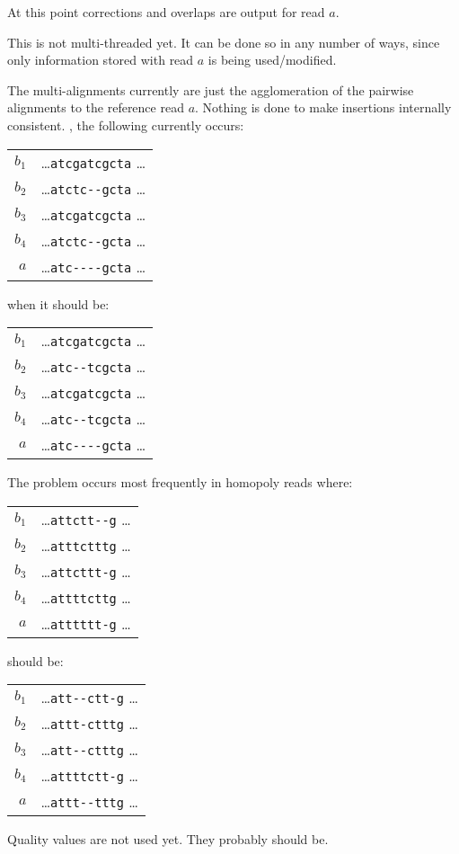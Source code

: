 \documentclass[letterpaper,11pt]{article}
\newenvironment{technotes}{\bq\small\bf\bi\exdent{Technical Notes:}}{\ei\eq}
\def\btn{\begin{technotes}}
\def\etn{\end{technotes}}
\begin{document}
  At this point corrections and overlaps are output for read $a$.
  \btn
  \item
    This is not multi-threaded yet.  It can be done so in any number of ways,
    since only information stored with read $a$ is being used/modified.
  \item
    The multi-alignments currently are just the agglomeration of the
    pairwise alignments to the reference read $a$.  Nothing is done to
    make insertions internally consistent.  \Eg, the following currently
    occurs:
    \bq
      \begin{tabular}{rl}
        $b_1$ & \ldots \verb`atcgatcgcta` \ldots \\
        $b_2$ & \ldots \verb`atctc--gcta` \ldots \\
        $b_3$ & \ldots \verb`atcgatcgcta` \ldots \\
        $b_4$ & \ldots \verb`atctc--gcta` \ldots \\
          $a$ & \ldots \verb`atc----gcta` \ldots
      \end{tabular}
    \eq
    when it should be:
    \bq
      \begin{tabular}{rl}
        $b_1$ & \ldots \verb`atcgatcgcta` \ldots \\
        $b_2$ & \ldots \verb`atc--tcgcta` \ldots \\
        $b_3$ & \ldots \verb`atcgatcgcta` \ldots \\
        $b_4$ & \ldots \verb`atc--tcgcta` \ldots \\
          $a$ & \ldots \verb`atc----gcta` \ldots
      \end{tabular}
    \eq
    The problem occurs most frequently in homopoly reads where:
    \bq
      \begin{tabular}{rl}
        $b_1$ & \ldots \verb`attctt--g` \ldots \\
        $b_2$ & \ldots \verb`atttctttg` \ldots \\
        $b_3$ & \ldots \verb`attcttt-g` \ldots \\
        $b_4$ & \ldots \verb`attttcttg` \ldots \\
          $a$ & \ldots \verb`atttttt-g` \ldots
      \end{tabular}
    \eq
    should be:
    \bq
      \begin{tabular}{rl}
        $b_1$ & \ldots \verb`att--ctt-g` \ldots \\
        $b_2$ & \ldots \verb`attt-ctttg` \ldots \\
        $b_3$ & \ldots \verb`att--ctttg` \ldots \\
        $b_4$ & \ldots \verb`attttctt-g` \ldots \\
          $a$ & \ldots \verb`attt--tttg` \ldots
      \end{tabular}
    \eq
  \item
    Quality values are not used yet.  They probably should be.
  \etn
  
\end{document}
